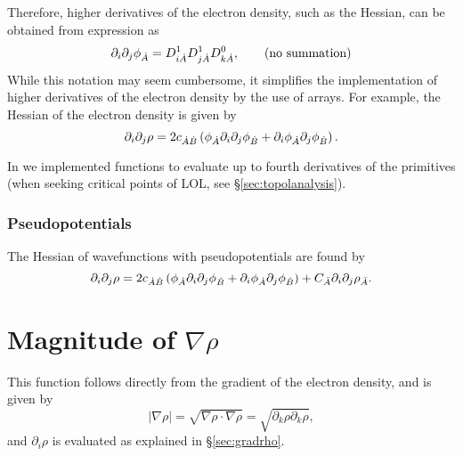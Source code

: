 Therefore, higher derivatives of the electron density, such as the Hessian, can be obtained from expression as
%
\begin{equation}
  \partial_i\partial_j\phi_{\dot{A}}=D_{i\dot{A}}^1D_{j\dot{A}}^1D^0_{k\dot{A}}, \qquad\textrm{(no summation)}
\end{equation}
%
While this notation may seem cumbersome, it simplifies the implementation of higher derivatives of the electron density by the use of arrays. For example, the Hessian of the electron density is given by
%
\begin{equation}
   \partial_i\partial_j\rho=2c_{\dot{A}\dot{B}}\left(\phi_{\dot{A}}\partial_i\partial_j\phi_{\dot{B}}+\partial_i\phi_{\dot{A}}\partial_j\phi_{\dot{B}}\right).
\end{equation}
%

In \DTK{} we implemented functions to evaluate up to fourth derivatives of the primitives
(when seeking critical points of LOL,
see \S\ref{sec:topolanalysis}).


\subsubsection{Pseudopotentials}

The Hessian of wavefunctions with pseudopotentials are found by
%
\begin{equation}%
  \partial_i\partial_j\rho=2c_{\dA\dB}\left(\phi_{\dA}\partial_i\partial_j\phi_{\dB}+\partial_i\phi_{\dA}\partial_j\phi_{\dB}\right)+C_{\bA}\partial_i\partial_j\rho_{\bA}.
\end{equation}
%


\section{Magnitude of $\nabla\rho$}
This function follows directly from the gradient of the electron density, and is given by
%
\begin{equation}
   |\nabla\rho|=\sqrt{\nabla\rho\cdot\nabla\rho}=\sqrt{\partial_k\rho\partial_k\rho},
\end{equation}
%
and $\partial_i\rho$ is evaluated as explained in \S\ref{sec:gradrho}.
